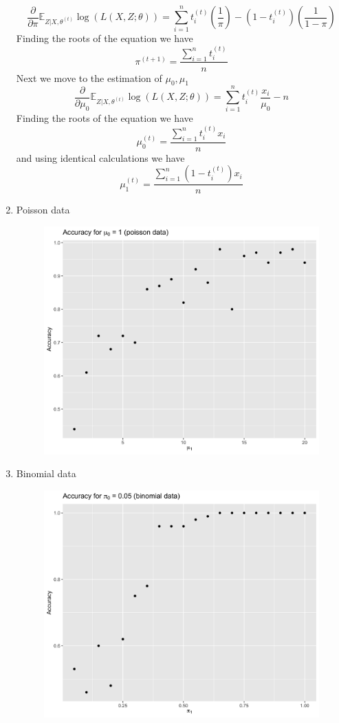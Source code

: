 \documentclass[a4paper]{article}
\begin{document}
\begin{enumerate}
\[
\frac{\partial}{\partial\pi}\mathbb{E}_{Z|X,\theta^{(t)}} \log (L(X,Z;\theta)) =  \sum_{i=1}^{n} t_i^{(t)} (\frac{1}{\pi})- (1-t_i^{(t)})(\frac{1}{1-\pi})
\]
Finding the roots of the equation we have
\[
\pi^{(t+1)} = \frac{\sum_{i=1}^{n}t_i^{(t)}}{n}
\]
Next we move to the estimation of $\mu_0,\mu_1$
\[
\frac{\partial}{\partial\mu_0}\mathbb{E}_{Z|X,\theta^{(t)}} \log (L(X,Z;\theta)) = 
\sum_{i=1}^{n} t_i^{(t)} \frac{x_i}{\mu_0} -n
\]
Finding the roots of the equation we have
\[
\mu_0^{(t)} = \frac{\sum_{i=1}^{n} t_i^{(t)} x_i}{n}
\]
and using identical calculations we have
\[
\mu_1^{(t)} = \frac{\sum_{i=1}^{n} (1-t_i^{(t)}) x_i}{n}
\]
\item Poisson data
\begin{figure}[H]
\includegraphics[scale=0.15]{pois.png}
\end{figure}
\item Binomial data
\begin{figure}[H]
\includegraphics[scale=0.15]{binom.png}
\end{figure}
\end{enumerate}
\end{document}
